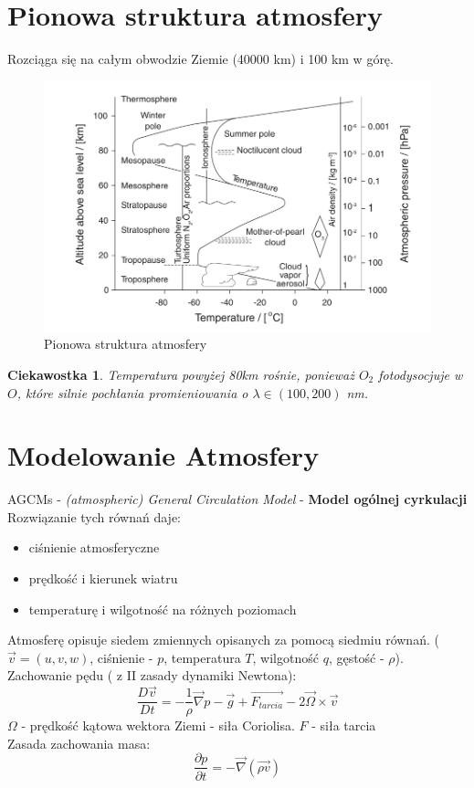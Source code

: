 \documentclass{article}
\theoremstyle{plain}
\newtheorem{ciekaw}{Ciekawostka}
\begin{document}
\section{Pionowa struktura atmosfery}
Rozciąga się na całym obwodzie Ziemie (40000 km) i 100 km w górę.
\begin{figure}[h]
\begin{center}
	\includegraphics[width=0.7\linewidth]{images/Figure2}
	\caption{Pionowa struktura atmosfery}
\end{center}
\end{figure}
\begin{ciekaw}
	Temperatura powyżej 80km rośnie, ponieważ $O_2$ fotodysocjuje w $O$, które silnie pochłania promieniowania o $\lambda \in(100,200)$ nm.	
\end{ciekaw}

\section{Modelowanie Atmosfery}
AGCMs - \textit{(atmospheric) General Circulation Model} - \textbf{Model ogólnej cyrkulacji}
	Rozwiązanie tych równań daje:
	\begin{itemize}
		\item ciśnienie atmosferyczne
		\item prędkość i kierunek wiatru
		\item temperaturę i wilgotność na różnych poziomach
	\end{itemize}
	Atmosferę opisuje siedem zmiennych opisanych za pomocą siedmiu równań. ($\overrightarrow{v} = (u,v,w)$, ciśnienie - $p$, temperatura $T$, wilgotność $q$, gęstość - $\rho$).\\
	Zachowanie pędu ( z II zasady dynamiki Newtona):
	\begin{equation}
		\frac{D\overrightarrow{v}}{Dt} = -\frac{1}{\rho}\overrightarrow\nabla p - \overrightarrow{g} + \overrightarrow{F_{tarcia}} - 2\overrightarrow{\Omega}\times\overrightarrow{v}
	\end{equation}
	$\Omega$ - prędkość kątowa wektora Ziemi - siła Coriolisa. $F$ - siła tarcia\\
	Zasada zachowania masa:
	\begin{equation}
		\frac{\partial p}{\partial t} = -\overrightarrow{\nabla}(\overrightarrow{\rho v})
	\end{equation}
\end{document}
